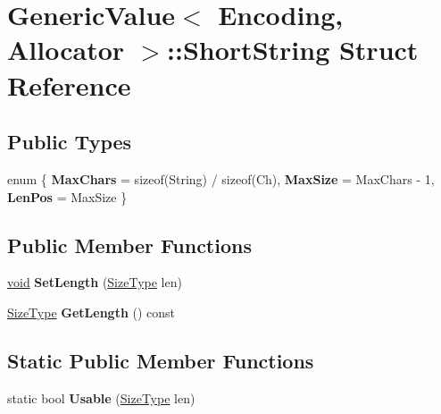 \hypertarget{struct_generic_value_1_1_short_string}{}\section{Generic\+Value$<$ Encoding, Allocator $>$\+:\+:Short\+String Struct Reference}
\label{struct_generic_value_1_1_short_string}
\subsection*{Public Types}
\begin{DoxyCompactItemize}
\item 
\hypertarget{struct_generic_value_1_1_short_string_a9458c3a0d0eda7bac977cb41f1a19360}{}enum \{ {\bfseries Max\+Chars} = sizeof(String) / sizeof(Ch), 
{\bfseries Max\+Size} = Max\+Chars -\/ 1, 
{\bfseries Len\+Pos} = Max\+Size
 \}\label{struct_generic_value_1_1_short_string_a9458c3a0d0eda7bac977cb41f1a19360}

\end{DoxyCompactItemize}
\subsection*{Public Member Functions}
\begin{DoxyCompactItemize}
\item 
\hypertarget{struct_generic_value_1_1_short_string_adbfe8461e0cb0ccb2cb3825489e743c2}{}\hyperlink{_s_d_l__audio_8h_a52835ae37c4bb905b903cbaf5d04b05f}{void} {\bfseries Set\+Length} (\hyperlink{rapidjson_8h_a5ed6e6e67250fadbd041127e6386dcb5}{Size\+Type} len)\label{struct_generic_value_1_1_short_string_adbfe8461e0cb0ccb2cb3825489e743c2}

\item 
\hypertarget{struct_generic_value_1_1_short_string_a65bea5171312b2243a1ec70ec6fa93cd}{}\hyperlink{rapidjson_8h_a5ed6e6e67250fadbd041127e6386dcb5}{Size\+Type} {\bfseries Get\+Length} () const \label{struct_generic_value_1_1_short_string_a65bea5171312b2243a1ec70ec6fa93cd}

\end{DoxyCompactItemize}
\subsection*{Static Public Member Functions}
\begin{DoxyCompactItemize}
\item 
\hypertarget{struct_generic_value_1_1_short_string_a73e40f625c1abbd84f95ac7fff8365f7}{}static bool {\bfseries Usable} (\hyperlink{rapidjson_8h_a5ed6e6e67250fadbd041127e6386dcb5}{Size\+Type} len)\label{struct_generic_value_1_1_short_string_a73e40f625c1abbd84f95ac7fff8365f7}

\end{DoxyCompactItemize}
